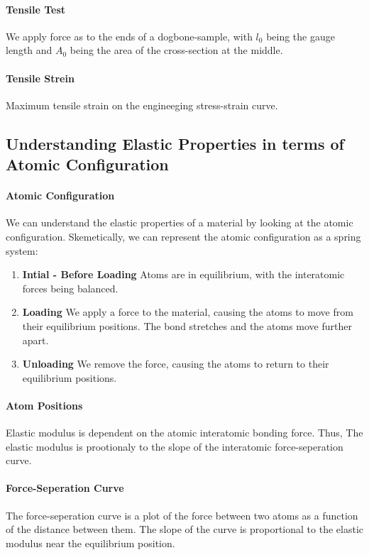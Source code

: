 \documentclass[11pt]{report}
\begin{document}
\paragraph{Tensile Test} We apply force as to the ends of a dogbone-sample, with $l_0$ being the gauge length and $A_0$ being the area of the cross-section at the middle. 
\paragraph{Tensile Strein} Maximum tensile strain on the engineeging stress-strain curve.
\subsection{Understanding Elastic Properties in terms of Atomic Configuration}
\paragraph{Atomic Configuration} We can understand the elastic properties of a material by looking at the atomic configuration. Skemetically, we can represent the atomic configuration as a spring system:
\begin{enumerate}
    \item \textbf{Intial - Before Loading} Atoms are in equilibrium, with the interatomic forces being balanced.
    \item \textbf{Loading} We apply a force to the material, causing the atoms to move from their equilibrium positions. The bond stretches and the atoms move further apart.
    \item \textbf{Unloading} We remove the force, causing the atoms to return to their equilibrium positions. 
\end{enumerate}
\paragraph{Atom Positions} Elastic modulus is dependent on the atomic interatomic bonding force. Thus, The elastic modulus is prootionaly to the slope of the interatomic force-seperation curve.
\paragraph{Force-Seperation Curve} The force-seperation curve is a plot of the force between two atoms as a function of the distance between them. The slope of the curve is proportional to the elastic modulus near the equilibrium position.
\end{document}
